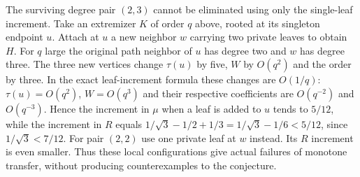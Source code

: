 \documentclass[11pt,a4paper]{article}
\begin{document}
The surviving degree pair $(2,3)$ cannot be eliminated using only the
single-leaf increment. Take an extremizer $K$ of order $q$ above, rooted
at its singleton endpoint $u$. Attach at $u$ a new neighbor $w$ carrying
two private leaves to obtain $H$. For $q$ large the original path
neighbor of $u$ has degree two and $w$ has degree three. The three new
vertices change $\tau(u)$ by five, $W$ by $O(q^2)$ and the order by
three. In the exact leaf-increment formula these changes are $O(1/q)$:
$\tau(u)=O(q^2)$, $W=O(q^3)$ and their respective coefficients are
$O(q^{-2})$ and $O(q^{-3})$. Hence the increment in $\mu$ when a leaf
is added to $u$ tends to $5/12$, while the increment in $R$ equals
$1/\sqrt3-1/2+1/3=1/\sqrt3-1/6<5/12$, since
$1/\sqrt3<7/12$. For pair $(2,2)$ use one private leaf at $w$ instead.
Its $R$ increment is even smaller. Thus these local configurations
give actual failures of monotone transfer, without producing
counterexamples to the conjecture.
\end{document}
